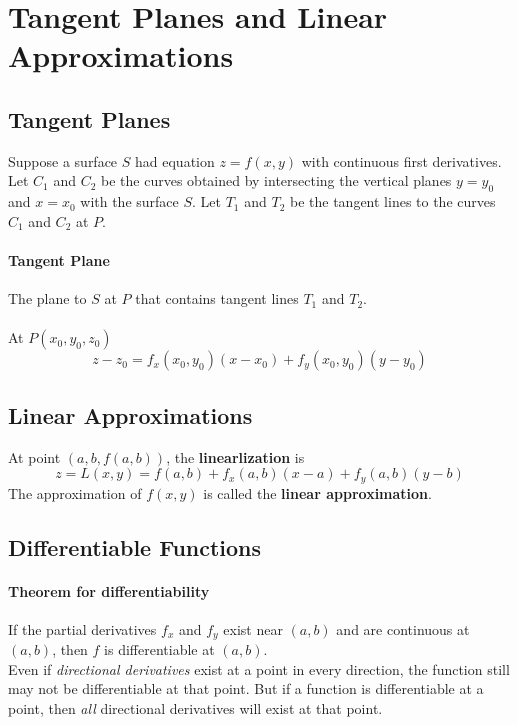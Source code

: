 \documentclass{report}  %
\begin{document}
\newpage

\section{Tangent Planes and Linear Approximations}
\subsection*{Tangent Planes}
Suppose a surface $S$ had equation $z=f(x,y)$ with continuous first derivatives.
Let $C_1$ and $C_2$ be the curves obtained by intersecting the vertical planes $y=y_0$ and $x=x_0$ with the surface $S$. 
Let $T_1$ and $T_2$ be the tangent lines to the curves $C_1$ and $C_2$ at $P$. 

\paragraph{Tangent Plane} The plane to $S$ at $P$ that contains tangent lines $T_1$ and $T_2$. \\ \\
At $P(x_0,y_0,z_0)$
\begin{equation}
	z - z_0 = f_x(x_0,y_0)(x-x_0) + f_y(x_0,y_0)(y-y_0)
\end{equation}

\subsection*{Linear Approximations}
At point $(a, b, f(a, b))$, the \textbf{linearlization} is
\begin{equation}
	z = L(x, y) = f(a, b) + f_x(a,b)(x-a) + f_y(a,b)(y-b)
\end{equation}
The approximation of $f(x, y)$ is called the \textbf{linear approximation}.

\subsection*{Differentiable Functions}
\paragraph{Theorem for differentiability} If the partial derivatives $f_x$ and $f_y$ exist near $(a, b)$ and are continuous at $(a, b)$, then $f$ is differentiable at $(a, b)$. \\ 

Even if \textit{directional derivatives} exist at a point in every direction, the function still may not be differentiable at that point. 
But if a function is differentiable at a point, then \textit{all} directional derivatives will exist at that point. 
\end{document}
